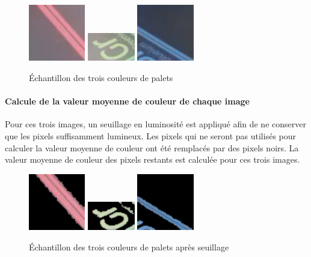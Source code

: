 \documentclass{report}
\begin{document}
\begin{figure}[!h]
\begin{center}
\includegraphics[height=70pt]{rouge_init.png}
\includegraphics[height=35pt]{vert_init.png}
\includegraphics[height=70pt]{bleu_init.png}
\end{center}
\caption{Échantillon des trois couleurs de palets}
\label{couleurs}
\end{figure}

\paragraph{Calcule de la valeur moyenne de couleur de chaque image}
Pour ces trois images, un seuillage en luminosité est appliqué afin de ne conserver que les pixels suffisamment lumineux.
Les pixels qui ne seront pas utilisés pour calculer la valeur moyenne de couleur ont été remplacés par des pixels noirs.
La valeur moyenne de couleur des pixels restants est calculée pour ces trois images.
\begin{figure}[!h]
\begin{center}
\includegraphics[height=70pt]{rouge_seuillee.png}
\includegraphics[height=35pt]{vert_seuillee.png}
\includegraphics[height=70pt]{bleu_seuillee.png}
\end{center}
\caption{Échantillon des trois couleurs de palets après seuillage}
\label{couleurs_seuillee}
\end{figure}
\end{document}
